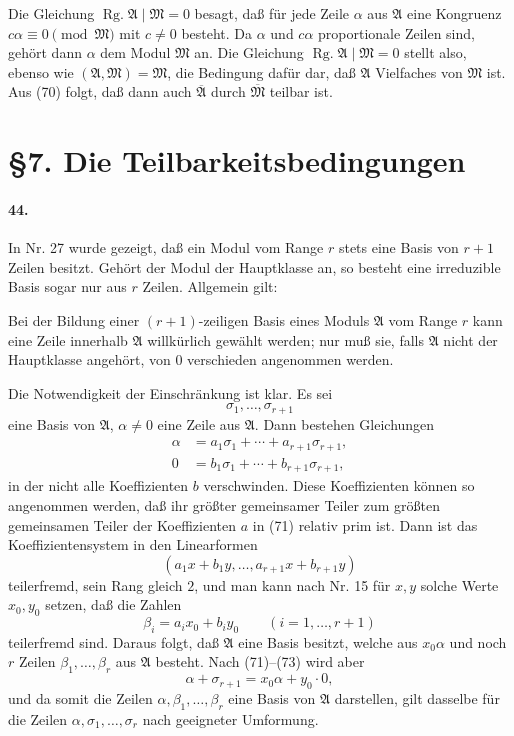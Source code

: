 \documentclass[11pt]{article}
\newcommand{\Rg}{\operatorname{Rg.}}
\begin{document}
Die Gleichung $\Rg\mathfrak A\mid\mathfrak M=0$ besagt, daß für jede Zeile $\alpha$ aus $\mathfrak A$ eine Kongruenz $c\alpha\equiv0\pmod{\mathfrak M}$ mit $c\ne0$ besteht. Da $\alpha$ und $c\alpha$ proportionale Zeilen sind, gehört dann $\alpha$ dem Modul $\mathfrak M$ an. Die Gleichung $\Rg\mathfrak A\mid\mathfrak M=0$ stellt also, ebenso wie $(\mathfrak A,
\mathfrak M)=\mathfrak M$, die Bedingung dafür dar, daß $\mathfrak A$ Vielfaches von $\mathfrak M$ ist. Aus (70) folgt, daß dann auch $\overline{\mathfrak A}$ durch $\overline{\mathfrak M}$ teilbar ist.

\section*{\S 7. Die Teilbarkeitsbedingungen}

\paragraph{44.}
In Nr. 27 wurde gezeigt, daß ein Modul vom Range $r$ stets eine Basis von $r+1$ Zeilen besitzt. Gehört der Modul der Hauptklasse an, so besteht eine irreduzible Basis sogar nur aus $r$ Zeilen. Allgemein gilt:

Bei der Bildung einer $(r+1)$-zeiligen Basis eines Moduls $\mathfrak A$ vom Range $r$ kann eine Zeile innerhalb $\mathfrak A$ willkürlich gewählt werden; nur muß sie, falls $\mathfrak A$ nicht der Hauptklasse angehört, von $0$ verschieden angenommen werden.

Die Notwendigkeit der Einschränkung ist klar. Es sei
\[
\sigma_1,
\ldots,
\sigma_{r+1}
\]
eine Basis von $\mathfrak A$, $\alpha\ne0$ eine Zeile aus $\mathfrak A$. Dann bestehen Gleichungen
\begin{align}
\alpha&=a_1\sigma_1+
\cdots+a_{r+1}\sigma_{r+1},
\tag{71}\\
0&=b_1\sigma_1+
\cdots+b_{r+1}\sigma_{r+1},
\tag{72}
\end{align}
in der nicht alle Koeffizienten $b$ verschwinden. Diese Koeffizienten können so angenommen werden, daß ihr größter gemeinsamer Teiler zum größten gemeinsamen Teiler der Koeffizienten $a$ in (71) relativ prim ist. Dann ist das Koeffizientensystem in den Linearformen
\[
(a_1x+b_1y,
\ldots,
 a_{r+1}x+b_{r+1}y)
\]
teilerfremd, sein Rang gleich $2$, und man kann nach Nr. 15 für $x,y$ solche Werte $x_0,y_0$ setzen, daß die Zahlen
\begin{equation}
\beta_i=a_ix_0+b_iy_0\qquad(i=1,
\ldots,r+1)
\tag{73}
\end{equation}
teilerfremd sind. Daraus folgt, daß $\mathfrak A$ eine Basis besitzt, welche aus $x_0\alpha$ und noch $r$ Zeilen $\beta_1,
\ldots,
\beta_r$ aus $\mathfrak A$ besteht. Nach (71)--(73) wird aber
\[
\alpha+\sigma_{r+1}=x_0\alpha+y_0\cdot0,
\]
und da somit die Zeilen $\alpha,
\beta_1,
\ldots,
\beta_r$ eine Basis von $\mathfrak A$ darstellen, gilt dasselbe für die Zeilen $\alpha,
\sigma_1,
\ldots,
\sigma_r$ nach geeigneter Umformung.
\end{document}
